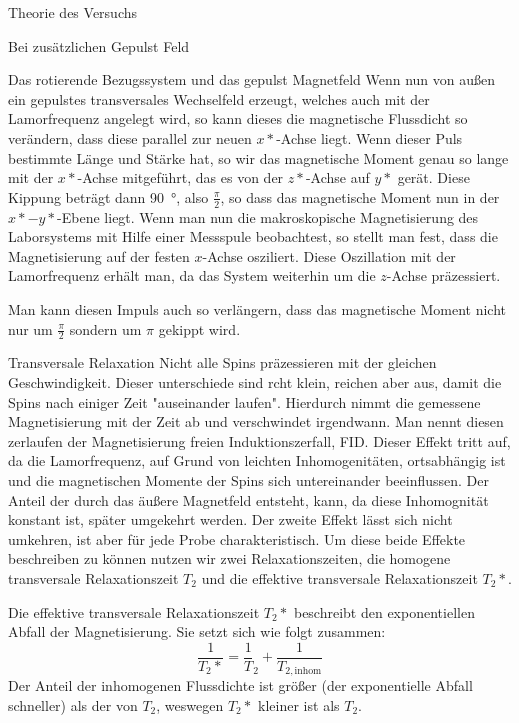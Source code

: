 \documentclass[pdftex, a4paper,11pt, twoside, ngerman]{report}
\begin{document}
\begin{chapter}{Theorie des Versuchs}
\begin{section}{Bei zusätzlichen Gepulst Feld}
\begin{subsection}{Das rotierende Bezugssystem und das gepulst Magnetfeld}
            Wenn nun von außen ein gepulstes transversales Wechselfeld erzeugt, welches auch mit der Lamorfrequenz angelegt wird, so kann dieses die magnetische Flussdicht so verändern, dass diese parallel zur neuen $x*$-Achse liegt.
            Wenn dieser Puls bestimmte Länge und Stärke hat, so wir das magnetische Moment genau so lange mit der $x*$-Achse mitgeführt, das es von der $z*$-Achse auf $y*$ gerät.
            Diese Kippung beträgt dann \SI{90}{\degree}, also $\frac \pi 2$, so dass das magnetische Moment nun in der $x*-y*$-Ebene liegt.
            Wenn man nun die makroskopische Magnetisierung des Laborsystems mit Hilfe einer Messspule beobachtest, so stellt man fest, dass die Magnetisierung auf der festen $x$-Achse osziliert. 
            Diese Oszillation mit der Lamorfrequenz erhält man, da das System weiterhin um die $z$-Achse präzessiert.

            Man kann diesen Impuls auch so verlängern, dass das magnetische Moment nicht nur um $\frac \pi 2$ sondern um $\pi$ gekippt wird. \todo
            
        \end{subsection}

        \begin{subsection}{Transversale Relaxation}
            Nicht alle Spins präzessieren mit der gleichen Geschwindigkeit.
            Dieser unterschiede sind rcht klein, reichen aber aus, damit die Spins nach einiger Zeit "auseinander laufen". 
            Hierdurch nimmt die gemessene Magnetisierung mit der Zeit ab und verschwindet irgendwann.
            Man nennt diesen zerlaufen der Magnetisierung freien Induktionszerfall, FID.
            Dieser Effekt tritt auf, da die Lamorfrequenz, auf Grund von leichten Inhomogenitäten, ortsabhängig ist und die magnetischen Momente der Spins sich untereinander beeinflussen. 
            Der Anteil der durch das äußere Magnetfeld entsteht, kann, da diese Inhomognität konstant ist, später umgekehrt werden.
            Der zweite Effekt lässt sich nicht umkehren, ist aber für jede Probe charakteristisch.
            Um diese beide Effekte beschreiben zu können nutzen wir zwei Relaxationszeiten, die homogene transversale Relaxationszeit $T_2$ und die effektive transversale Relaxationszeit $T_2*$.

            Die effektive transversale Relaxationszeit $T_2*$ beschreibt den exponentiellen Abfall der Magnetisierung. Sie setzt sich wie folgt zusammen:
            \[
                \frac 1 {T_2*} = \frac 1T_2 + \frac 1{T_{2,\text{inhom}}}
            \]
            Der Anteil der inhomogenen Flussdichte ist größer (der exponentielle Abfall schneller) als der von $T_2$, weswegen $T_2*$ kleiner ist als $T_2$.  
            

\end{subsection}
\end{section}
\end{chapter}
\end{document}
